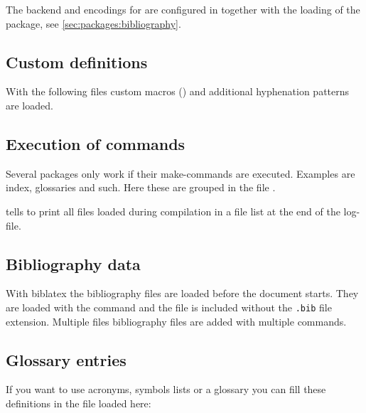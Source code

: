 The backend and encodings for  are configured in  together with the loading of the package, see \cref{sec:packages:bibliography}.
\subsection{Custom definitions}
\label{sec:preamble:custom}

With the following files custom macros () and additional hyphenation patterns  are loaded. 

\subsection{Execution of commands}
\label{sec:preamble:ExecutionOfCommands}
Several packages only work if their make-commands are executed. Examples are index, glossaries and such. Here these are grouped in the file . 

 tells \latex to print all files loaded during compilation in a file list at the end of the log-file.
%

\subsection{Bibliography data}
\label{sec:preamble:bibfiles}
With biblatex the bibliography files are loaded before the document starts. 
They are loaded with the command  and the file is included without the \texttt{.bib} file extension. Multiple files bibliography files are added with multiple  commands.

\subsection{Glossary entries}
\label{sec:document:acronyms}
If you want to use acronyms, symbols lists or a glossary you can fill these definitions in the file 
 loaded here:
%
